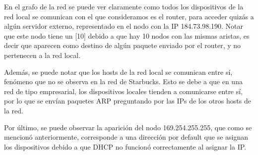 En el grafo de la red se puede ver claramente como todos los dispositivos de la red local se comunican con el que consideramos es el router, para acceder quizás a algún servidor externo, representado en el nodo con la IP 184.73.98.190. Notar que este nodo tiene un [10] debido a que hay 10 nodos con las mismas aristas, es decir que aparecen como destino de algún paquete enviado por el router, y no pertenecen a la red local.

Además, se puede notar que los hosts de la red local se comunican entre sí, fenómeno que no se observa en la red de Starbucks. Esto se debe a que en una red de tipo empresarial, los dispositivos locales tienden a comunicarse entre sí, por lo que se envían paquetes ARP preguntando por las IPs de los otros hosts de la red.

Por último, se puede observar la aparición del nodo 169.254.255.255, que como se mencionó anteriormente, corresponde a una dirección por default que se asignan los dispositivos debido a que DHCP no funcionó correctamente al asignar la IP.



